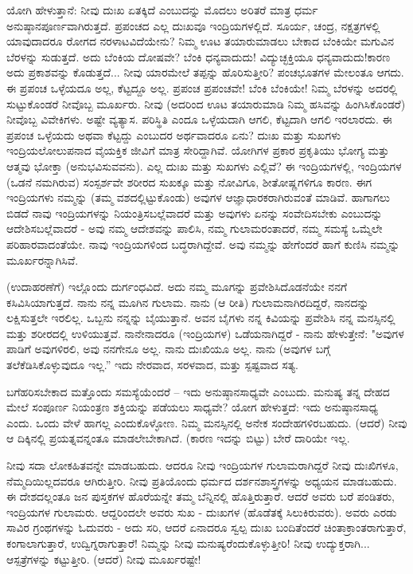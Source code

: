 ಯೋಗಿ ಹೇಳುತ್ತಾನೆ: ನೀವು ದುಃಖ ಏತಕ್ಕಿದೆ ಎಂಬುದನ್ನು ಮೊದಲು ಅರಿತರೆ ಮಾತ್ರ ಧರ್ಮ ಅನುಷ್ಠಾನಪೂರ್ಣವಾಗಿರುತ್ತದೆ. ಪ್ರಪಂಚದ ಎಲ್ಲ ದುಃಖವೂ ಇಂದ್ರಿಯಗಳಲ್ಲಿದೆ. ಸೂರ್ಯ, ಚಂದ್ರ, ನಕ್ಷತ್ರಗಳಲ್ಲಿ ಯಾವುದಾದರೂ ರೋಗದ ನರಳಾಟವಿದೆಯೇನು? ನಿಮ್ಮ ಊಟ ತಯಾರುಮಾಡಲು ಬೇಕಾದ ಬೆಂಕಿಯೇ ಮಗುವಿನ ಬೆರಳನ್ನು ಸುಡುತ್ತದೆ. ಅದು ಬೆಂಕಿಯ ದೋಷವೇ? ಬೆಂಕಿ ಧನ್ಯವಾದುದು! ವಿದ್ಯುಚ್ಛಕ್ತಿಯೂ ಧನ್ಯವಾದುದು!ಕಾರಣ ಅದು ಪ್ರಕಾಶವನ್ನು ಕೊಡುತ್ತದೆ... ನೀವು ಯಾರಮೇಲೆ ತಪ್ಪನ್ನು ಹೊರಿಸುತ್ತೀರಿ? ಪಂಚಭೂತಗಳ ಮೇಲಂತೂ ಆಗದು. ಈ ಪ್ರಪಂಚ ಒಳ್ಳೆಯದೂ ಅಲ್ಲ, ಕೆಟ್ಟದ್ದೂ ಅಲ್ಲ. ಪ್ರಪಂಚ ಪ್ರಪಂಚವೇ! ಬೆಂಕಿ ಬೆಂಕಿಯೇ! ನಿಮ್ಮ ಬೆರಳನ್ನು ಅದರಲ್ಲಿ ಸುಟ್ಟುಕೊಂಡರೆ ನೀವೊಬ್ಬ ಮೂರ್ಖರು. ನೀವು (ಅದರಿಂದ ಊಟ ತಯಾರುಮಾಡಿ ನಿಮ್ಮ ಹಸಿವನ್ನು ಹಿಂಗಿಸಿಕೊಂಡರೆ) ನೀವೊಬ್ಬ ವಿವೇಕಿಗಳು. ಅಷ್ಟೇ ವ್ಯತ್ಯಾಸ. ಪರಿಸ್ಥಿತಿ ಎಂದೂ ಒಳ್ಳೆಯದಾಗಿ ಆಗಲಿ, ಕೆಟ್ಟದಾಗಿ ಆಗಲಿ ಇರಲಾರದು. ಈ ಪ್ರಪಂಚ ಒಳ್ಳೆಯದು ಅಥವಾ ಕೆಟ್ಟದ್ದು ಎಂಬುದರ ಅರ್ಥವಾದರೂ ಏನು? ದುಃಖ ಮತ್ತು ಸುಖಗಳು ಇಂದ್ರಿಯಲೋಲುಪನಾದ ವೈಯಕ್ತಿಕ ಜೀವಿಗೆ ಮಾತ್ರ ಸೇರಿದ್ದಾಗಿವೆ. ಯೋಗಿಗಳ ಪ್ರಕಾರ ಪ್ರಕೃತಿಯು ಭೋಗ್ಯ ಮತ್ತು ಆತ್ಮವು ಭೋಕ್ತಾ (ಅನುಭವಿಸುವವನು). ಎಲ್ಲ ದುಃಖ ಮತ್ತು ಸುಖಗಳು ಎಲ್ಲಿವೆ? ಈ ಇಂದ್ರಿಯಗಳಲ್ಲಿ, ಇಂದ್ರಿಯಗಳ (ಒಡನೆ ನಮಗಿರುವ) ಸಂಸ್ಪರ್ಶವೇ ಶರೀರದ ಸುಖಕ್ಕೂ ಮತ್ತು ನೋವಿಗೂ, ಶೀತೋಷ್ಣಗಳಿಗೂ ಕಾರಣ. ಈಗ ಇಂದ್ರಿಯಗಳು ನಮ್ಮನ್ನು (ತಮ್ಮ ವಶದಲ್ಲಿಟ್ಟುಕೊಂಡು) ಅವುಗಳ ಆಜ್ಞಾಧಾರಕರಾಗಿರುವಂತೆ ಮಾಡಿವೆ. ಹಾಗಾಗಲು ಬಿಡದೆ ನಾವು ಇಂದ್ರಿಯಗಳನ್ನು ನಿಯಂತ್ರಿಸಬಲ್ಲೆವಾದರೆ ಮತ್ತು ಅವುಗಳು ಏನನ್ನು ಸಂವೇದಿಸಬೇಕು ಎಂಬುದನ್ನು ಆದೇಶಿಸಬಲ್ಲೆವಾದರೆ - ಅವು ನಮ್ಮ ಆದೇಶವನ್ನು ಪಾಲಿಸಿ, ನಮ್ಮ ಗುಲಾಮರಂತಾದರೆ, ನಮ್ಮ ಸಮಸ್ಯೆ ಒಮ್ಮೆಲೇ ಪರಿಹಾರವಾದಂತೆಯೇ. ನಾವು ಇಂದ್ರಿಯಗಳಿಂದ ಬದ್ಧರಾಗಿದ್ದೇವೆ. ಅವು ನಮ್ಮನ್ನು ಹೇಗೆಂದರೆ ಹಾಗೆ ಕುಣಿಸಿ ನಮ್ಮನ್ನು ಮೂರ್ಖರನ್ನಾಗಿಸಿವೆ.

(ಉದಾಹರಣೆಗೆ) ಇಲ್ಲೊಂದು ದುರ್ಗಂಧವಿದೆ. ಅದು ನಮ್ಮ ಮೂಗನ್ನು ಪ್ರವೇಶಿಸಿದೊಡನೆಯೇ ನನಗೆ ಕಸಿವಿಸಿಯಾಗುತ್ತದೆ. ನಾನು ನನ್ನ ಮೂಗಿನ ಗುಲಾಮ. ನಾನು (ಆ ರೀತಿ) ಗುಲಾಮನಾಗಿರದಿದ್ದರೆ, ನಾನದನ್ನು ಲಕ್ಷಿಸುತ್ತಲೇ ಇರಲಿಲ್ಲ. ಒಬ್ಬನು ನನ್ನನ್ನು ಬೈಯುತ್ತಾನೆ. ಅವನ ಬೈಗಳು ನನ್ನ ಕಿವಿಯನ್ನು ಪ್ರವೇಶಿಸಿ ನನ್ನ ಮನಸ್ಸಿನಲ್ಲಿ ಮತ್ತು ಶರೀರದಲ್ಲಿ ಉಳಿಯುತ್ತವೆ. ನಾನೇನಾದರೂ (ಇಂದ್ರಿಯಗಳ) ಒಡೆಯನಾಗಿದ್ದರೆ - ನಾನು ಹೇಳುತ್ತೇನೆ: "ಅವುಗಳ ಪಾಡಿಗೆ ಅವುಗಳಿರಲಿ, ಅವು ನನಗೇನೂ ಅಲ್ಲ. ನಾನು ದುಃಖಿಯೂ ಅಲ್ಲ. ನಾನು (ಅವುಗಳ ಬಗ್ಗೆ ತಲೆಕೆಡಿಸಿಕೊಳ್ಳುವುದೂ ಇಲ್ಲ.” ಇದು ನೇರವಾದ, ಸರಳವಾದ, ಮತ್ತು ಸ್ಪಷ್ಟವಾದ ಸತ್ಯ.

ಬಗೆಹರಿಸಬೇಕಾದ ಮತ್ತೊಂದು ಸಮಸ್ಯೆಯೆಂದರೆ – ಇದು ಅನುಷ್ಠಾನಸಾಧ್ಯವೇ ಎಂಬುದು. ಮನುಷ್ಯ ತನ್ನ ದೇಹದ ಮೇಲೆ ಸಂಪೂರ್ಣ ನಿಯಂತ್ರಣ ಶಕ್ತಿಯನ್ನು ಪಡೆಯಲು ಸಾಧ್ಯವೇ? ಯೋಗ ಹೇಳುತ್ತದೆ: ಇದು ಅನುಷ್ಠಾನಸಾಧ್ಯ ಎಂದು. ಒಂದು ವೇಳೆ ಹಾಗಲ್ಲ ಎಂದುಕೊಳ್ಳೋಣ. ನಿಮ್ಮ ಮನಸ್ಸಿನಲ್ಲಿ ಅನೇಕ ಸಂದೇಹಗಳಿರಬಹುದು. (ಆದರೆ) ನೀವು ಆ ದಿಕ್ಕಿನಲ್ಲಿ ಪ್ರಯತ್ನವನ್ನಂತೂ ಮಾಡಲೇಬೇಕಾಗಿದೆ. (ಕಾರಣ ಇದನ್ನು ಬಿಟ್ಟು) ಬೇರೆ ದಾರಿಯೇ ಇಲ್ಲ.

ನೀವು ಸದಾ ಲೋಕಹಿತವನ್ನೇ ಮಾಡಬಹುದು. ಆದರೂ ನೀವು ಇಂದ್ರಿಯಗಳ ಗುಲಾಮರಾಗಿದ್ದರೆ ನೀವು ದುಃಖಿಗಳೂ, ನೆಮ್ಮದಿಯಿಲ್ಲದವರೂ ಆಗಿರುತ್ತೀರಿ. ನೀವು ಪ್ರತಿಯೊಂದು ಧರ್ಮದ ದರ್ಶನಶಾಸ್ತ್ರಗಳನ್ನು ಅಧ್ಯಯನ ಮಾಡಬಹುದು. ಈ ದೇಶದಲ್ಲಂತೂ ಜನ ಪುಸ್ತಕಗಳ ಹೊರೆಯನ್ನೇ ತಮ್ಮ ಬೆನ್ನಿನಲ್ಲಿ ಹೊತ್ತಿರುತ್ತಾರೆ. ಆದರೆ ಅವರು ಬರೆ ಪಂಡಿತರು, ಇಂದ್ರಿಯಗಳ ಗುಲಾಮರು. ಆದ್ದರಿಂದಲೇ﻿ ಅವರು ಸುಖ - ದುಃಖಗಳ (ಹೊಡೆತಕ್ಕೆ ಸಿಲುಕಿರುವರು). ಅವರು ಎರಡು ಸಾವಿರ ಗ್ರಂಥಗಳನ್ನು ಓದುವರು - ಅದು ಸರಿ, ಆದರೆ ಏನಾದರೂ ಸ್ವಲ್ಪ ದುಃಖ ಬಂದಿತೆಂದರೆ ಚಿಂತಾಕ್ರಾಂತರಾಗುತ್ತಾರೆ, ಕಂಗಾಲಾಗುತ್ತಾರೆ, ಉದ್ವಿಗ್ನರಾಗುತ್ತಾರೆ! ನಿಮ್ಮನ್ನು ನೀವು ಮನುಷ್ಯರೆಂದುಕೊಳ್ಳುತ್ತೀರಿ! ನೀವು ಉದ್ಯುಕ್ತರಾಗಿ... ಆಸ್ಪತ್ರೆಗಳನ್ನು ಕಟ್ಟುತ್ತೀರಿ. (ಆದರೆ) ನೀವು ಮೂರ್ಖರಷ್ಟೇ!

